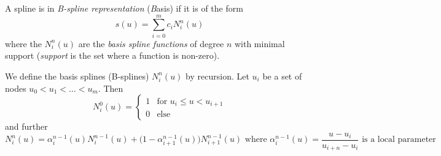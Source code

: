 \begin{definition}
    A spline is in \textit{B-spline representation} (\textit{B}asis)
    if it is of the form
    \[ s(u) = \sum_{i=0}^m c_i N^n_i(u) \]
    where the $N_i^n(u)$ are the \textit{basis spline functions}
    of degree $n$ with minimal support
    (\textit{support} is the set where a function is non-zero).

    We define the basis splines (B-splines) $N_i^n(u)$ by recursion.
    Let $u_i$ be a set of nodes $u_0 < u_1 < \dots < u_m$.
    Then
    \[
        N_i^0(u) = \begin{cases}
            1 & \text{for } u_i \le u < u_{i + 1}\\
            0 & \text{else}
        \end{cases}
    \]
    and further
    \[
        N_{i}^n(u) = \alpha_i^{n-1}(u) N_i^{n - 1}(u) +
        \bigl(1 - \alpha_{i+1}^{n-1}(u)\bigr) N_{i + 1}^{n-1}(u)
        \text{ where }
        \alpha_i^{n-1}(u) =
        \frac{u - u_i}{u_{i+n} - u_{i}}
        \text{ is a local parameter}
    \]
\end{definition}
